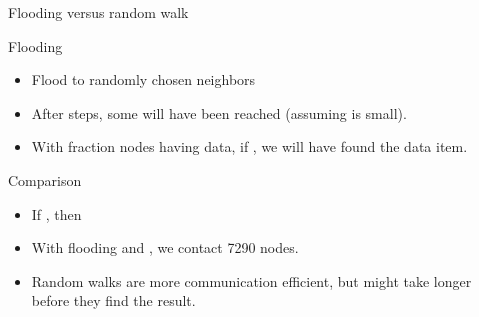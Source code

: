   \begin{slide}{Flooding versus random walk}
    \begin{block}{Flooding}
      \begin{itemize}\tightlist
      \item Flood to  randomly chosen neighbors
      \item After  steps, some  will have been reached (assuming
         is small).
      \item With fraction  nodes having data, if , we
        will have found the data item.
      \end{itemize}
    \end{block}
    \begin{exampleblock}{Comparison}
      \begin{itemize}
      \item If , then 
      \item With flooding and , we contact 7290 nodes.
      \item Random walks are more communication efficient, but might take longer before they find the result.
      \end{itemize}
    \end{exampleblock}
  \end{slide}
